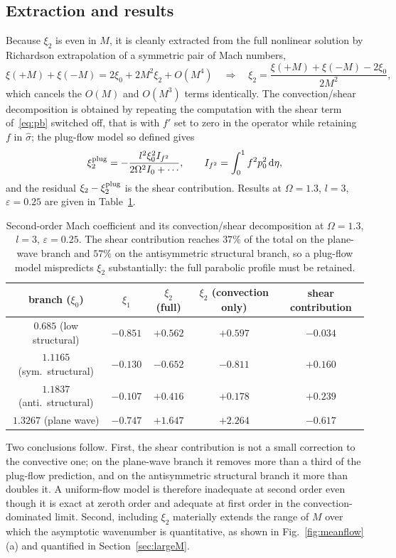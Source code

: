 \documentclass[11pt,a4paper]{article}
\newcommand{\Om}{\Omega}
\newcommand{\eps}{\varepsilon}
\newcommand{\dd}{\mathrm{d}}
\newcommand{\sig}{\hat\sigma}
\theoremstyle{plain}
\theoremstyle{remark}
\begin{document}
\subsection{Extraction and results}
Because $\xi_2$ is even in $M$, it is cleanly extracted from the full nonlinear solution by Richardson
extrapolation of a symmetric pair of Mach numbers,
\begin{equation}
\xi(+M)+\xi(-M)=2\xi_0+2M^2\xi_2+O(M^4)
\quad\Longrightarrow\quad
\xi_2=\frac{\xi(+M)+\xi(-M)-2\xi_0}{2M^2},
\label{eq:richardson}
\end{equation}
which cancels the $O(M)$ and $O(M^3)$ terms identically. The convection/shear decomposition is obtained
by repeating the computation with the shear term of~\eqref{eq:pb} switched off, that is with $f'$ set
to zero in the operator while retaining $f$ in $\sig$; the plug-flow model so defined gives
\begin{equation}
\xi_2^{\rm plug}=-\frac{l^2\xi_0^2I_{f^2}}{2\Om^2I_0+\cdots},
\qquad I_{f^2}=\int_0^1f^2p_0^2\,\dd\eta,
\end{equation}
and the residual $\xi_2-\xi_2^{\rm plug}$ is the shear contribution. Results at $\Om=1.3$, $l=3$,
$\eps=0.25$ are given in Table~\ref{tab:xi2}.

\begin{table}[htb]
\centering
\begin{tabular}{@{}ccccc@{}}
\toprule
branch ($\xi_0$) & $\xi_1$ & $\xi_2$ (full) & $\xi_2$ (convection only) & shear contribution\\
\midrule
$0.685$ (low structural) & $-0.851$ & $+0.562$ & $+0.597$ & $-0.034$\\
$1.1165$ (sym.\ structural) & $-0.130$ & $-0.652$ & $-0.811$ & $+0.160$\\
$1.1837$ (anti.\ structural) & $-0.107$ & $+0.416$ & $+0.178$ & $+0.239$\\
$1.3267$ (plane wave) & $-0.747$ & $+1.647$ & $+2.264$ & $-0.617$\\
\bottomrule
\end{tabular}
\caption{Second-order Mach coefficient and its convection/shear decomposition at $\Om=1.3$, $l=3$,
$\eps=0.25$. The shear contribution reaches $37\%$ of the total on the plane-wave branch and $57\%$ on
the antisymmetric structural branch, so a plug-flow model mispredicts $\xi_2$ substantially: the full
parabolic profile must be retained.}
\label{tab:xi2}
\end{table}

Two conclusions follow. First, the shear contribution is not a small correction to the convective one;
on the plane-wave branch it removes more than a third of the plug-flow prediction, and on the
antisymmetric structural branch it more than doubles it. A uniform-flow model is therefore inadequate
at second order even though it is exact at zeroth order and adequate at first order in the
convection-dominated limit. Second, including $\xi_2$ materially extends the range of $M$ over which
the asymptotic wavenumber is quantitative, as shown in Fig.~\ref{fig:meanflow}(a) and quantified in
Section~\ref{sec:largeM}.
\end{document}
